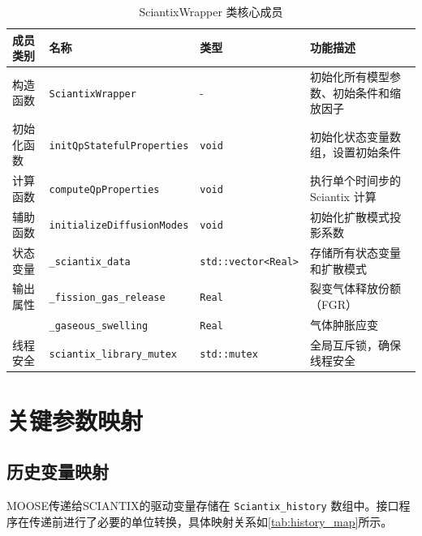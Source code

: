 \begin{table}[htbp]
	\centering
	\caption{SciantixWrapper 类核心成员}
	\label{tab:sciantix-class-members}
	\begin{tabularx}{\textwidth}{lllX} 
		\toprule
		成员类别 & 名称 & 类型 & 功能描述 \\
		\midrule
		构造函数 & \texttt{SciantixWrapper} & - & 初始化所有模型参数、初始条件和缩放因子 \\
		初始化函数 & \texttt{initQpStatefulProperties} & \texttt{void} & 初始化状态变量数组，设置初始条件 \\
		计算函数 & \texttt{computeQpProperties} & \texttt{void} & 执行单个时间步的 Sciantix 计算 \\
		辅助函数 & \texttt{initializeDiffusionModes} & \texttt{void} & 初始化扩散模式投影系数 \\
		状态变量 & \texttt{\_sciantix\_data} & \texttt{std::vector<Real>} & 存储所有状态变量和扩散模式 \\
		输出属性 & \texttt{\_fission\_gas\_release} & \texttt{Real} & 裂变气体释放份额（FGR） \\
		& \texttt{\_gaseous\_swelling} & \texttt{Real} & 气体肿胀应变 \\
		线程安全 & \texttt{sciantix\_library\_mutex} & \texttt{std::mutex} & 全局互斥锁，确保线程安全 \\
		\bottomrule
	\end{tabularx}
\end{table}

\section{关键参数映射}

\subsection{历史变量映射}
MOOSE传递给SCIANTIX的驱动变量存储在 \texttt{Sciantix\_history} 数组中。接口程序在传递前进行了必要的单位转换，具体映射关系如\tablename\ref{tab:history_map}所示。

